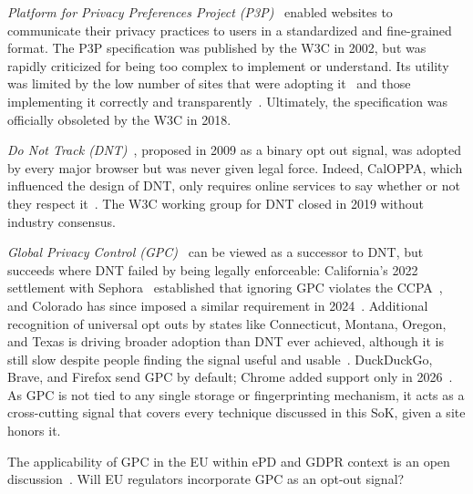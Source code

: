 \noindent
\textit{Platform for Privacy Preferences Project (P3P)}~\cite{reaglePlatformPrivacyPreferences1999,cranorPlatformPrivacyPreferences2002,byersSearchingPrivacyDesign2005,cranorPlatformPrivacyPreferences2006} enabled websites to communicate their privacy practices to users in a standardized and fine-grained format.
%
The P3P specification was published by the W3C in 2002, but was rapidly criticized for being too complex to implement or understand.
%
Its utility was limited by the low number of sites that were adopting it~\cite{cranorUseP3PUser2002} and those implementing it correctly and transparently~\cite{cranorAnalysisP3PDeployment2003, leonTokenAttemptMisrepresentation2010}.
%
Ultimately, the specification was officially obsoleted by the W3C in 2018.

\noindent
\textit{Do Not Track (DNT)}~\cite{fieldingTrackingPreferenceExpression2019}, proposed in 2009 as a binary opt out signal, was adopted by every major browser but was never given legal force.
%
Indeed, CalOPPA, which influenced the design of DNT, only requires online services to say whether or not they respect it~\cite{CaliforniaCodeBPC2003}.
%
The W3C working group for DNT closed in 2019 without industry consensus.

\noindent\textit{Global Privacy Control (GPC)}~\cite{zimmeckGlobalPrivacyControl2024} can be viewed as a successor to DNT, but succeeds where DNT failed by being legally enforceable: California's 2022 settlement with Sephora~\cite{bontaAttorneyGeneralBonta2022} established that ignoring GPC violates the CCPA~\cite{attorneygeneralbecerraCCPARequiresBusinesses2021}, and Colorado has since imposed a similar requirement in 2024~\cite{coloradodepartmentoflawUniversalOptOutShortlist2024}.
%
Additional recognition of universal opt outs by states like Connecticut, Montana, Oregon, and Texas is driving broader adoption than DNT ever achieved, although it is still slow despite people finding the signal useful and usable~\cite{zimmeckUsabilityEnforceabilityGlobal2023,zimmeckGeneralizableActivePrivacy2024,azizJohnnyStillCant2024}.
%
DuckDuckGo, Brave, and Firefox send GPC by default; Chrome added support only in 2026~\cite{googleGlobalPrivacyControl2025}.
%
As GPC is not tied to any single storage or fingerprinting mechanism, it acts as a cross-cutting signal that covers every technique discussed in this SoK, given a site honors it.

\begin{opbox}
The applicability of GPC in the EU within ePD and GDPR context is an open discussion~\cite{berjonGPCGDPR2021,bielovaEffectDesignPatterns2024
}. Will EU regulators incorporate GPC as an opt-out signal? 
\end{opbox}
